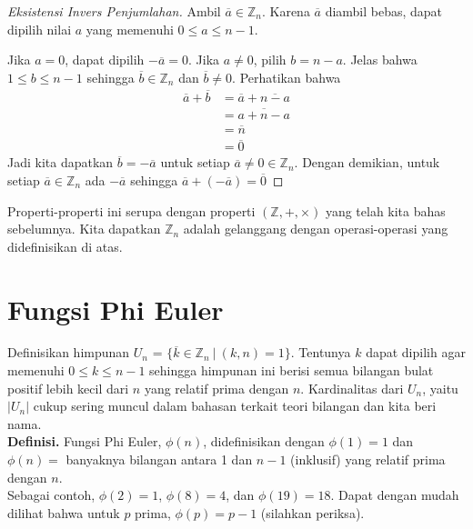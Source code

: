 	\begin{proof}[Eksistensi Invers Penjumlahan]
		Ambil $\overline{a} \in \mathbb{Z}_n$. Karena $\overline{a}$ diambil bebas, dapat dipilih nilai $a$ yang memenuhi $0 \le a \le n-1$.
		
		Jika $a = 0$, dapat dipilih $-\overline{a} = 0$. Jika $a \ne 0$, pilih $b = n-a$. Jelas bahwa $1 \le b \le n-1$ sehingga $\overline{b} \in \mathbb{Z}_n$ dan $\overline{b} \ne 0$. Perhatikan bahwa
		\begin{equation*}
		\begin{split}
			\overline{a} + \overline{b} & = \overline{a} + \overline{n - a}\\
			& = \overline{a + n - a}\\
			& = \overline{n}\\
			& = \overline{0}
		\end{split}
		\end{equation*}
		Jadi kita dapatkan $\overline{b} = -\overline{a}$ untuk setiap $\overline{a} \ne 0 \in \mathbb{Z}_n$. Dengan demikian, untuk setiap $\overline{a} \in \mathbb{Z}_n$ ada $-\overline{a}$ sehingga $\overline{a} + (-\overline{a}) = \overline{0}$
	\end{proof}
	Properti-properti ini serupa dengan properti $(\mathbb{Z},+,\times)$ yang telah kita bahas sebelumnya. Kita dapatkan $\mathbb{Z}_n$ adalah gelanggang dengan operasi-operasi yang didefinisikan di atas.
	\\
	
	\section{Fungsi Phi Euler}
	Definisikan himpunan $U_n$ = $\{ \overline{k} \in \mathbb{Z}_n \ | \ (k,n) = 1 \}$. Tentunya $k$ dapat dipilih agar memenuhi $0 \le k \le n-1$ sehingga himpunan ini berisi semua bilangan bulat positif lebih kecil dari $n$ yang relatif prima dengan $n$. Kardinalitas dari $U_n$, yaitu $|U_n|$ cukup sering muncul dalam bahasan terkait teori bilangan dan kita beri nama.
	\\
	
	\textbf{Definisi. } Fungsi Phi Euler, $\phi(n)$, didefinisikan dengan $\phi(1) = 1$ dan $\phi(n) = $ banyaknya bilangan antara 1 dan $n-1$ (inklusif) yang relatif prima dengan $n$.
	\\
	
	Sebagai contoh, $\phi(2) = 1$, $\phi(8) = 4$, dan $\phi(19) = 18$. Dapat dengan mudah dilihat bahwa untuk $p$ prima, $\phi(p) = p-1$ (silahkan periksa).
	\\
	
